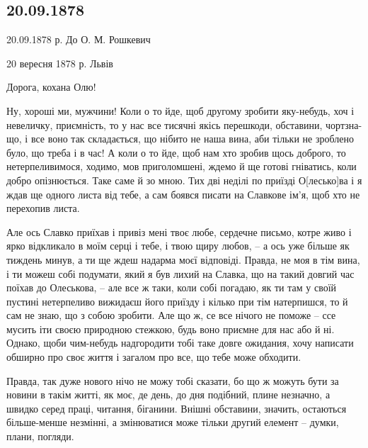  
 
 
 
 

\subsection{20.09.1878}

20.09.1878 р. До О. М. Рошкевич       

20 вересня 1878 р. Львів                    

Дорога, кохана Олю!                         

 Ну, хороші ми, мужчини! Коли о то йде, щоб другому зробити яку-небудь, хоч і
 невеличку, приємність, то у нас все тисячні якісь перешкоди, обставини,
 чортзна-що, і все воно так складається, що нібито не наша вина, аби тільки не
 зроблено було, що треба і в час! А коли о то йде, щоб нам хто зробив щось
 доброго, то нетерпеливимося, ходимо, мов приголомшені, ждемо й ще готові
 гніватись, коли добро опізнюється. Таке саме й зо мною. Тих дві неділі по
 приїзді О[лесько]ва і я ждав ще одного листа від тебе, а сам боявся писати на
 Славкове ім’я, щоб хто не перехопив листа.

Але ось Славко приїхав і привіз мені твоє любе, сердечне письмо, котре живо і
ярко відкликало в моїм серці і тебе, і твою щиру любов, – а ось уже більше як
тиждень минув, а ти ще ждеш надарма моєї відповіді. Правда, не моя в тім вина,
і ти можеш собі подумати, який я був лихий на Славка, що на такий довгий час
поїхав до Олеськова, – але все ж таки, коли собі погадаю, як ти там у своїй
пустині нетерпеливо вижидаєш його приїзду і кілько при тім натерпишся, то й сам
не знаю, що з собою зробити. Але що ж, се все нічого не поможе – ссе мусить іти
своєю природною стежкою, будь воно приємне для нас або й ні. Однако, щоби
чим-небудь надгородити тобі таке довге ожидания, хочу написати обширно про своє
життя і загалом про все, що тебе може обходити.

Правда, так дуже нового нічо не можу тобі сказати, бо що ж можуть бути за
новини в такім житті, як моє, де день, до дня подібний, плине незначно, а
швидко серед праці, читання, біганини. Внішні обставини, значить, остаються
більше-менше незмінні, а змінюватися може тільки другий елемент – думки, плани,
погляди.


